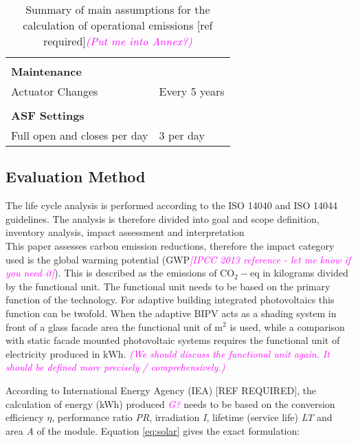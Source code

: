 \begin{table}[H]
\begin{tabular}{ll}
                              &                                                \\
\textbf{Maintenance}          &                                                \\
Actuator Changes              & Every 5 years                                  \\
                              &                                                \\
\textbf{ASF Settings}         &                                                \\
Full open and closes per day  & 3 per day                                      \\
\hline
\end{tabular}
\caption{Summary of main assumptions for the calculation of operational emissions [ref required]\textcolor{magenta}{\textit{(Put me into Annex?)}}}
\label{tab:AssumptionsOpp}
\end{table}



\subsection{Evaluation Method}
The life cycle analysis is performed according to the ISO 14040 and ISO 14044 guidelines. The analysis is therefore divided into goal and scope definition, inventory analysis, impact assessment and interpretation\\ %

This paper assesses carbon emission reductions, therefore the impact category used is the global warming potential (GWP\textcolor{magenta}{\textit{[IPCC 2013 reference - let me know if you need it]}}). This is described as the emissions of ${\mathrm{CO_2-eq}}$ in kilograms divided by the functional unit. The functional unit needs to be based on the primary function of the technology. For adaptive building integrated photovoltaics this function can be twofold. When the adaptive BIPV acts as a shading system in front of a glass facade area the functional unit of ${\mathrm{m^2}}$ is used, while a comparison with static facade mounted photovoltaic systems requires the functional unit of electricity produced in ${\mathrm{kWh}}$. \textcolor{magenta}{\textit{(We should discuss the functional unit again. It should be defined more precisely / comprehensively.)}}

According to International Energy Agency (IEA) [REF REQUIRED], the calculation of energy (kWh) produced \textcolor{magenta}{\textit{G?}} needs to be based on the conversion efficiency ${\eta}$, performance ratio \textit{PR}, irradiation \textit{I}, lifetime (service life) \textit{LT} and area \textit{A} of the module. Equation \ref{eq:solar} gives the exact formulation:
	

